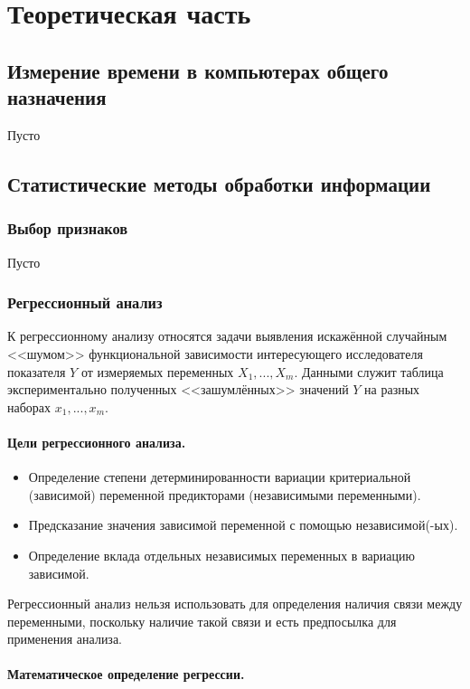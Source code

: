 \section{Теоретическая часть}
\subsection{Измерение времени в компьютерах общего назначения}
Пусто

\subsection{Статистические методы обработки информации}
\subsubsection{Выбор признаков}
Пусто


\subsubsection{Регрессионный анализ}

К регрессионному анализу относятся задачи выявления искажённой случайным <<шумом>> функциональной зависимости интересующего исследователя показателя $Y$ от измеряемых переменных $X_1,...,X_m$. Данными служит таблица экспериментально полученных <<зашумлённых>> значений $Y$ на разных наборах $x_1,...,x_m$. \cite{lag}

\paragraph{Цели регрессионного анализа.}

\begin{itemize}
    \item Определение степени детерминированности вариации критериальной (зависимой) переменной предикторами (независимыми переменными).
    \item Предсказание значения зависимой переменной с помощью независимой(-ых).
    \item Определение вклада отдельных независимых переменных в вариацию зависимой.
\end{itemize}

Регрессионный анализ нельзя использовать для определения наличия связи между переменными, поскольку наличие такой связи и есть предпосылка для применения анализа.

\paragraph{Математическое определение регрессии.}

